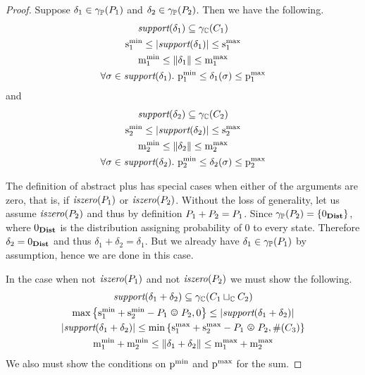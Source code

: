 \begin{proof}
Suppose $\delta_1 \in \gamma_{\mathbb{P}}(P_{1})$ and $\delta_2 \in \gamma_{\mathbb{P}}(P_{2})$.  Then we have the following.
\begin{gather}
\label{thm:pp:plus:cond1a}
\nzset{\delta_1} \subseteq \pconc{\getpoly{1}} \\
\label{thm:pp:plus:cond2a}
\smin{1} \leq \setsize{\nzset{\delta_1}} \leq \smax{1} \\
\label{thm:pp:plus:cond3a}
\mmin{1} \leq \pmass{\delta_1} \leq \mmax{1} \\
\label{thm:pp:plus:cond4a}
\forall \sigma \in \nzset{\delta_1}.\ \pmin{1} \leq \delta_1(\sigma) \leq \pmax{1}
\end{gather}
and
\begin{gather}
\label{thm:pp:plus:cond1b}
\nzset{\delta_2} \subseteq \pconc{\getpoly{2}} \\
\label{thm:pp:plus:cond2b}
\smin{2} \leq \setsize{\nzset{\delta_2}} \leq \smax{2} \\
\label{thm:pp:plus:cond3b}
\mmin{2} \leq \pmass{\delta_2} \leq \mmax{2} \\
\label{thm:pp:plus:cond4b}
\forall \sigma \in \nzset{\delta_2}.\ \pmin{2} \leq \delta_2(\sigma) \leq \pmax{2}
\end{gather}

The definition of abstract plus has special cases when either of the
arguments are zero, that is, if $ \mathit{iszero}(P_{1}) $ or
$ \mathit{iszero}(P_{2}) $. Without the loss of generality, let us assume
$ \mathit{iszero}(P_{2}) $ and thus by definition $ P_{1} + P_{2} = P_{1}
$. Since $ \gamma_{\mathbb{P}}(P_{2}) = \left\{ 0_{\textbf{Dist}} \right\} $, where $ 0_{\textbf{Dist}} $ is
the distribution assigning probability of $ 0 $ to every state. Therefore $ \delta_2
= 0_{\textbf{Dist}} $ and thus $ \delta_1 + \delta_2 = \delta_1 $. But we
already have $ \delta_1 \in \gamma_{\mathbb{P}}(P_{1}) $ by assumption, hence we
are done in this case.

In the case when not $ \mathit{iszero}(P_{1}) $ and not $ \mathit{iszero}(P_{2}) $
we must show the following.
\begin{gather}
\label{thm:pp:plus:cond1c}
\nzset{\delta_1 + \delta_2} \subseteq \pconc{\getpoly{1} \pjoin \getpoly{2}} \\
\label{thm:pp:plus:cond2c1}
\maxparen{\smin{1} + \smin{2} - \optoverlap{\ppa}{\ppb}, 0}\leq \setsize{\nzset{\delta_1 + \delta_2}}\\
\label{thm:pp:plus:cond2c2}
\setsize{\nzset{\delta_1 + \delta_2}} \leq \minparen{\smax{1}
+ \smax{2} - \pessoverlap{\ppa}{\ppb},  \psize{\getpoly{3}}} \\
\label{thm:pp:plus:cond3c}
\mmin{1} + \mmin{2}\leq \pmass{\delta_1 + \delta_2} \leq \mmax{1} + \mmax{2}
\end{gather}
We also must show the conditions on $\mathrm{p}^\mathrm{min}_{}$ and $\mathrm{p}^\mathrm{max}_{}$ for the sum.



\end{proof}
